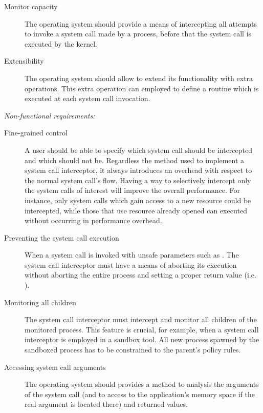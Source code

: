 \begin{description}

\item[Monitor capacity]
  The operating system should provide a means of intercepting all attempts to invoke a system call made by a process, before that the system call is executed by the kernel.
  
\item[Extensibility] 
  The operating system should allow to extend its functionality with extra operations. This extra operation can employed to define a routine which is executed at each  system 
  call invocation.
  
\end{description}


{\setlength{\parindent}{0cm}
\textit{Non-functional requirements:} 
}

\begin{description}


\item[Fine-grained control]
A user should be able to specify which system call should be intercepted and which should not be. Regardless the method used to implement a system call interceptor, it always introduces an overhead with respect to the normal system call's flow.  Having a way to selectively intercept only the system calls of interest will improve the overall performance. For instance, only system calls which gain access to a new resource could be intercepted, while those that use resource already opened can executed without occurring in performance overhead.    

\item[Preventing the system call execution]
When a system call is invoked with unsafe parameters such as . The system call interceptor must have a means of aborting its execution without aborting the entire process and setting a proper return value (i.e. ). 

\item[Monitoring all children]
 The system call interceptor must intercept and monitor all children of the monitored process. This feature is crucial, for example, when a system call interceptor is employed in a sandbox tool. All new process spawned by the sandboxed process has to be constrained to the parent's policy rules.

\item[Accessing system call arguments]
 The operating system should provides a method to analysis the arguments of the system call (and to access to the application’s memory space if the real argument is located there) and returned values.
 
 
\end{description}


